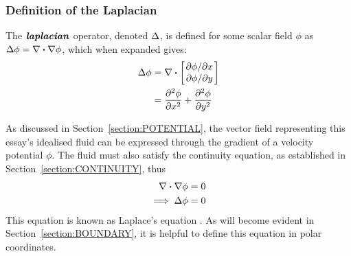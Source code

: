 \subsubsection{Definition of the Laplacian}
\begin{defn}
    The $\textbf{\textit{laplacian}}$ operator, denoted $\Delta$, is defined for some scalar field $\phi$ as $\laplacian\phi=\divergence{\gradient{\phi}}$, which
    when expanded gives:
    \begin{align*}
        \laplacian\phi&=\divergence{\begin{bmatrix}
            \pdv*{\phi}{x}\\
            \pdv*{\phi}{y}
        \end{bmatrix}}\\
        &=\pdv[2]{\phi}{x}+\pdv[2]{\phi}{y}
    \end{align*}
\end{defn}
As discussed in Section~\ref{section:POTENTIAL}, the vector field representing this essay's idealised fluid can be expressed through the gradient of a velocity potential
$\phi$. The fluid must also satisfy the continuity equation, as established in Section~\ref{section:CONTINUITY}, thus
\begin{align*}
    \divergence{\nabla\phi}&=0\\
    \implies\laplacian\phi&=0
\end{align*}
This equation is known as Laplace's equation \cite{LEWIS2022131}. As will become evident in Section~\ref{section:BOUNDARY}, it is helpful to define this equation in polar coordinates.

